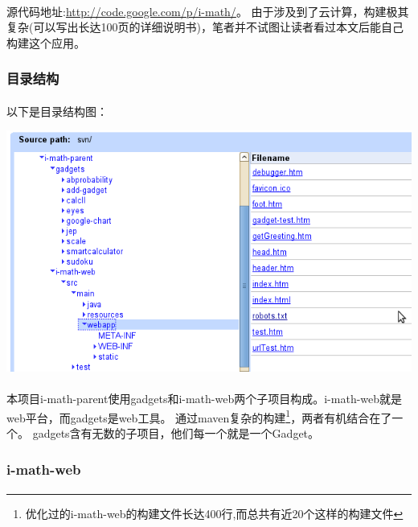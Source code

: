 \documentclass[12pt,a4paper,titlepage]{article}
\begin{document}
\paragraph{}
源代码地址:\href{http://code.google.com/p/i-math/}{\color{blue}http://code.google.com/p/i-math/}。
由于涉及到了云计算，构建极其复杂(可以写出长达100页的详细说明书)，笔者并不试图让读者看过本文后能自己构建这个应用。

\subsubsection{目录结构}
\paragraph{}
以下是目录结构图：

\includegraphics[width=\textwidth]{dic.png}

\paragraph{}
本项目i-math-parent使用gadgets和i-math-web两个子项目构成。i-math-web就是web平台，而gadgets是web工具。
通过maven复杂的构建\footnote{优化过的i-math-web的构建文件长达400行,而总共有近20个这样的构建文件}，两者有机结合在了一个。
gadgets含有无数的子项目，他们每一个就是一个Gadget。

\subsubsection{i-math-web}
\paragraph{}
\end{document}
